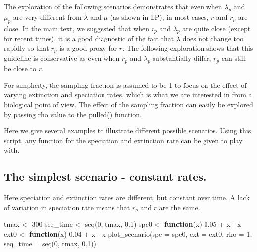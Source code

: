\documentclass[
]{article}
\newenvironment{Shaded}{\begin{snugshade}}{\end{snugshade}}
\newcommand{\AttributeTok}[1]{\textcolor[rgb]{0.77,0.63,0.00}{#1}}
\newcommand{\ControlFlowTok}[1]{\textcolor[rgb]{0.13,0.29,0.53}{\textbf{#1}}}
\newcommand{\DecValTok}[1]{\textcolor[rgb]{0.00,0.00,0.81}{#1}}
\newcommand{\FloatTok}[1]{\textcolor[rgb]{0.00,0.00,0.81}{#1}}
\newcommand{\FunctionTok}[1]{\textcolor[rgb]{0.00,0.00,0.00}{#1}}
\newcommand{\NormalTok}[1]{#1}
\newcommand{\OtherTok}[1]{\textcolor[rgb]{0.56,0.35,0.01}{#1}}
\newcommand{\SpecialCharTok}[1]{\textcolor[rgb]{0.00,0.00,0.00}{#1}}
\begin{document}
The exploration of the following scenarios demonstrates that even when
\(\lambda_p\) and \(\mu_p\) are very different from \(\lambda\) and
\(\mu\) (as shown in LP), in most cases, \(r\) and \(r_p\) are close. In
the main text, we suggested that when \(r_p\) and \(\lambda_p\) are
quite close (except for recent times), it is a good diagnostic of the
fact that \(\lambda\) does not change too rapidly so that \(r_p\) is a
good proxy for \(r\). The following exploration shows that this
guideline is conservative as even when \(r_p\) and \(\lambda_p\)
substantially differ, \(r_p\) can still be close to \(r\).

For simplicity, the sampling fraction is assumed to be 1 to focus on the
effect of varying extinction and speciation rates, which is what we are
interested in from a biological point of view. The effect of the
sampling fraction can easily be explored by passing rho value to the
pulled() function.

Here we give several examples to illustrate different possible
scenarios. Using this script, any function for the speciation and
extinction rate can be given to play with.

\hypertarget{the-simplest-scenario---constant-rates.}{%
\subsection{The simplest scenario - constant
rates.}\label{the-simplest-scenario---constant-rates.}}

Here speciation and extinction rates are different, but constant over
time. A lack of variation in speciation rate means that \(r_p\) and
\(r\) are the same.

\begin{Shaded}
\begin{Highlighting}[]
\NormalTok{tmax }\OtherTok{\textless{}{-}} \DecValTok{300}
\NormalTok{seq\_time }\OtherTok{\textless{}{-}} \FunctionTok{seq}\NormalTok{(}\DecValTok{0}\NormalTok{, tmax, }\FloatTok{0.1}\NormalTok{)}
\NormalTok{spe0 }\OtherTok{\textless{}{-}} \ControlFlowTok{function}\NormalTok{(x) }\FloatTok{0.05} \SpecialCharTok{+}\NormalTok{ x }\SpecialCharTok{{-}}\NormalTok{ x}
\NormalTok{ext0 }\OtherTok{\textless{}{-}} \ControlFlowTok{function}\NormalTok{(x) }\FloatTok{0.04} \SpecialCharTok{+}\NormalTok{ x }\SpecialCharTok{{-}}\NormalTok{ x}
\FunctionTok{plot\_scenario}\NormalTok{(}\AttributeTok{spe =}\NormalTok{ spe0, }\AttributeTok{ext =}\NormalTok{ ext0, }\AttributeTok{rho =} \DecValTok{1}\NormalTok{, }\AttributeTok{seq\_time =} \FunctionTok{seq}\NormalTok{(}\DecValTok{0}\NormalTok{,}
\NormalTok{    tmax, }\FloatTok{0.1}\NormalTok{))}
\end{Highlighting}
\end{Shaded}
\end{document}
